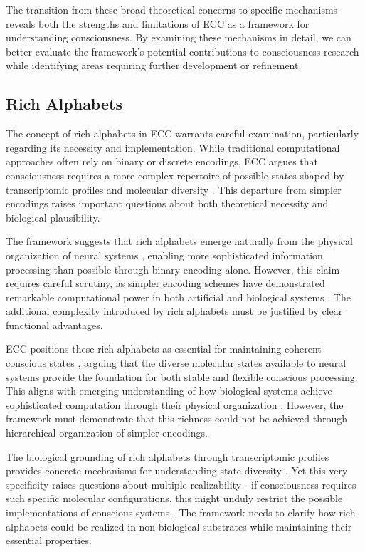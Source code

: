 The transition from these broad theoretical concerns to specific mechanisms reveals both the strengths and limitations of ECC as a framework for understanding consciousness. By examining these mechanisms in detail, we can better evaluate the framework's potential contributions to consciousness research while identifying areas requiring further development or refinement.

\subsection{Rich Alphabets}

The concept of rich alphabets in ECC warrants careful examination, particularly regarding its necessity and implementation. While traditional computational approaches often rely on binary or discrete encodings, ECC argues that consciousness requires a more complex repertoire of possible states shaped by transcriptomic profiles and molecular diversity \cite{koch2019feeling}. This departure from simpler encodings raises important questions about both theoretical necessity and biological plausibility.

The framework suggests that rich alphabets emerge naturally from the physical organization of neural systems \cite{varela2016embodied}, enabling more sophisticated information processing than possible through binary encoding alone. However, this claim requires careful scrutiny, as simpler encoding schemes have demonstrated remarkable computational power in both artificial and biological systems \cite{dennett2017bacteria}. The additional complexity introduced by rich alphabets must be justified by clear functional advantages.

ECC positions these rich alphabets as essential for maintaining coherent conscious states \cite{thompson2014waking}, arguing that the diverse molecular states available to neural systems provide the foundation for both stable and flexible conscious processing. This aligns with emerging understanding of how biological systems achieve sophisticated computation through their physical organization \cite{feinberg2016ancient}. However, the framework must demonstrate that this richness could not be achieved through hierarchical organization of simpler encodings.

The biological grounding of rich alphabets through transcriptomic profiles provides concrete mechanisms for understanding state diversity \cite{churchland2013touching}. Yet this very specificity raises questions about multiple realizability - if consciousness requires such specific molecular configurations, this might unduly restrict the possible implementations of conscious systems \cite{goff2019galileo}. The framework needs to clarify how rich alphabets could be realized in non-biological substrates while maintaining their essential properties.

